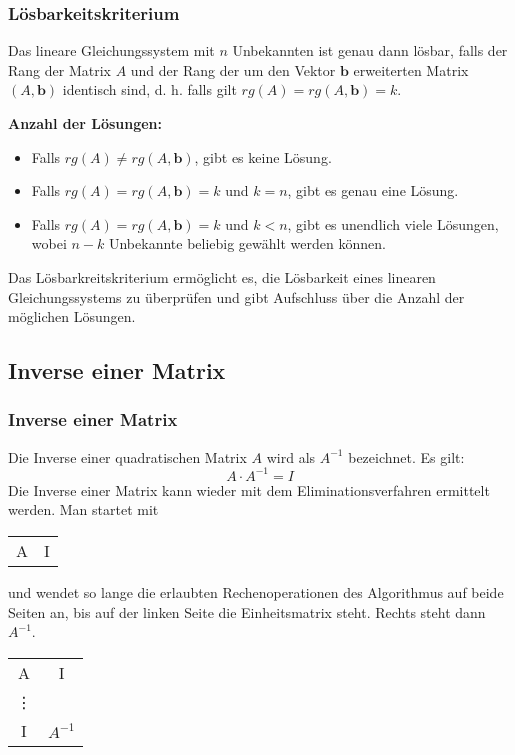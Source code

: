 \documentclass{beamer}
\begin{document}
\begin{frame}
  \frametitle{Lösbarkeitskriterium}
  
  Das lineare Gleichungssystem mit $n$ Unbekannten ist genau dann lösbar, falls der Rang der Matrix $A$ und der Rang der um den Vektor $\mathbf{b}$ erweiterten Matrix $(A, \mathbf{b})$ identisch sind, d. h. falls gilt $rg(A) = rg(A, \mathbf{b}) = k$.
  
  \vspace{0.3cm}
  
  \textbf{Anzahl der Lösungen:}
  
  \begin{itemize}
    \item Falls $rg(A) \neq rg(A, \mathbf{b})$, gibt es keine Lösung.
    \item Falls $rg(A) = rg(A, \mathbf{b}) = k$ und $k = n$, gibt es genau eine Lösung.
    \item Falls $rg(A) = rg(A, \mathbf{b}) = k$ und $k < n$, gibt es unendlich viele Lösungen, wobei $n - k$ Unbekannte beliebig gewählt werden können.
  \end{itemize}
  
  \vspace{0.3cm}
  
  Das Lösbarkreitskriterium ermöglicht es, die Lösbarkeit eines linearen Gleichungssystems zu überprüfen und gibt Aufschluss über die Anzahl der möglichen Lösungen.
\end{frame}

\subsection{Inverse einer Matrix}
\begin{frame}
  \frametitle{Inverse einer Matrix}
  
  Die Inverse einer quadratischen Matrix $A$ wird als $A^{-1}$ bezeichnet. Es gilt:
  $$ A \cdot A^{-1} = I$$
  \vspace{0.3cm}
  Die Inverse einer Matrix kann wieder mit dem Eliminationsverfahren ermittelt werden. Man startet mit
  \begin{center}
    \begin{tabular}{c|c}
      A & I\\      
    \end{tabular}
  \end{center}
  und wendet so lange die erlaubten Rechenoperationen des Algorithmus auf beide Seiten an, bis auf der linken Seite die Einheitsmatrix steht. 
  Rechts steht dann $A^{-1}$.
  \begin{center}
    \begin{tabular}{c|c}
      A & I\\ 
      \vdots \\
      I & $A^{-1}$
    \end{tabular}
  \end{center}

\end{frame}
\end{document}
